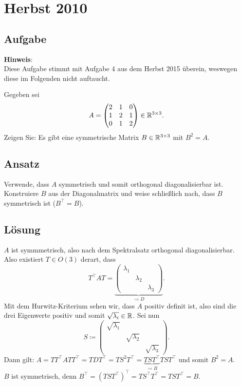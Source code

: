 \section{Herbst 2010}

\subsection{Aufgabe}
\begin{remark}
	\textbf{Hinweis}:
	\\
	Diese Aufgabe stimmt mit Aufgabe 4 aus dem Herbst 2015 überein, weswegen diese im Folgenden nicht auftaucht.
\end{remark}
Gegeben sei
\begin{equation*}
	A = \begin{pmatrix}
		2 & 1 & 0 \\
		1 & 2 & 1 \\
		0 & 1 & 2
	\end{pmatrix} \in \mathbb{R}^{3 \times 3}\text{.}
\end{equation*}
Zeigen Sie: Es gibt eine symmetrische Matrix \( B \in \mathbb{R}^{3 \times 3} \) mit \( B^2 = A \).

\subsection{Ansatz}
Verwende, dass \( A \) symmetrisch und somit orthogonal diagonalisierbar ist. Konstruiere \( B \) aus der Diagonalmatrix und weise schließlich nach, dass \( B \) symmetrisch ist (\( B^\top = B \)).

\subsection{Lösung}
\( A \) ist symmmetrisch, also nach dem Spektralsatz orthogonal diagonalisierbar. Also existiert \( T \in O(3) \) derart, dass
\begin{equation*}
	T^\top AT = \underbrace{\left( \begin{smallmatrix}
		\lambda_1 & & \\
		& \lambda_2 & \\
		& & \lambda_3 
	\end{smallmatrix} \right)}_{\coloneqq D}\text{.}
\end{equation*}
Mit dem Hurwitz-Kriterium sehen wir, dass \( A \) positiv definit ist, also sind die drei Eigenwerte positiv und somit \( \sqrt{\lambda_i} \in \mathbb{R} \). Sei nun
\begin{equation*}
 	S \coloneqq \left( \begin{smallmatrix}
 		\sqrt{\lambda_1} & & \\
 		& \sqrt{\lambda_2} & \\
 		& & \sqrt{\lambda_3} 
 	\end{smallmatrix} \right)\text{.}
 \end{equation*} 
 Dann gilt:
 \( A = TT^\top ATT^\top = TDT^\top = TS^2T^\top = \underbrace{TST^\top}_{\coloneqq B} TST^\top \) und somit \( B^2=A \). \\
 \( B \) ist symmetrisch, denn \( B^\top = (TST^\top)^\top = TS^\top T^\top = TST^\top = B \).


